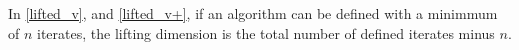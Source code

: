 In \eqref{lifted_v}, and \eqref{lifted_v+}, if an algorithm can be defined with a minimmum of $n$ iterates, the lifting dimension is the total number of defined iterates minus $n$.
